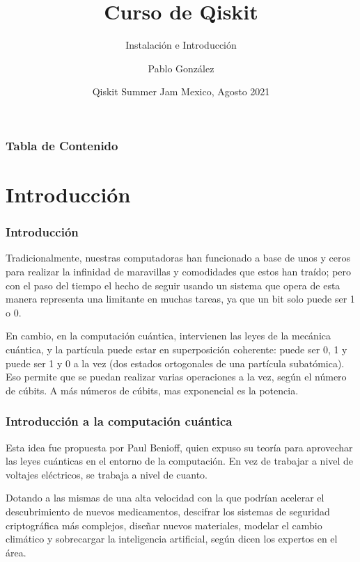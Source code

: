 \documentclass[spanish]{beamer}
\title[QMexico]  %
{Curso de Qiskit}   %
\subtitle{Instalación e Introducción}  %
\author{Pablo González}  %
\institute[QMexico]  %
\date[Agosto 2021]  %
{Qiskit Summer Jam Mexico, Agosto 2021}
\begin{document}
\frame[plain]{\titlepage}


\begin{frame}
\frametitle{Tabla de Contenido}
\tableofcontents
\end{frame}
\section{Introducción}   
\newpage
\setlength{\parskip}{5mm}
\justify
\begin{frame}
\frametitle{Introducción}
Tradicionalmente, nuestras computadoras han funcionado a base de unos y ceros para realizar la infinidad de maravillas y comodidades que estos han traído; pero con el paso del tiempo el hecho de  seguir usando un sistema que opera de esta manera representa una limitante en muchas tareas, ya que un bit solo puede ser 1 o 0. 

En cambio, en la computación cuántica, intervienen las leyes de la mecánica cuántica, y la partícula puede estar en superposición coherente: puede ser 0, 1 y puede ser 1 y 0 a la vez (dos estados ortogonales de una partícula subatómica). Eso permite que se puedan realizar varias operaciones a la vez, según el número de cúbits. A más números de cúbits, mas exponencial es la potencia.
\end{frame}
\newpage
\setlength{\parskip}{5mm}
\begin{frame}
\frametitle{Introducción a la computación cuántica}
Esta idea fue propuesta por Paul Benioff, quien expuso su teoría para aprovechar las leyes cuánticas en el entorno de la computación. En vez de trabajar a nivel de voltajes eléctricos, se trabaja a nivel de cuanto. 

Dotando a las mismas de una alta velocidad con la que podrían acelerar el descubrimiento de nuevos medicamentos, descifrar los sistemas de seguridad criptográfica más complejos, diseñar nuevos materiales, modelar el cambio climático y sobrecargar la inteligencia artificial, según dicen los expertos en el área.
\end{frame}
\end{document}
